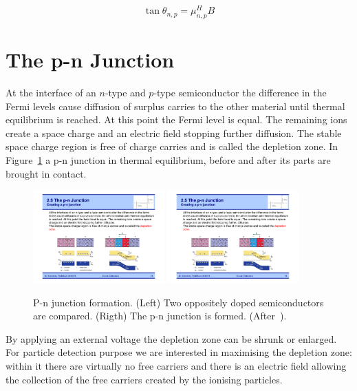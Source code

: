 \begin{equation}
\tan{\theta_{n,p}}=\mu_{n,p}^HB
\label{eq:LorentzAngle}
\end{equation}

\section{The p-n Junction}
\label{sec:pnjunction}

At the interface of an $n$-type and $p$-type semiconductor the difference in the Fermi levels cause 
diffusion 
of surplus carries to the other material until thermal equilibrium is reached. At this point the Fermi 
level 
is equal. The remaining ions create a 
space charge and an electric field stopping further diffusion. 
The stable space charge region is free of charge carries and is called the depletion zone. 
In Figure~\ref{fig:pnJunction} a p-n junction in thermal equilibrium, before and after its parts are 
brought in contact.

\begin{figure}[!htbp]
   \centering
   \includegraphics[width=0.45\textwidth]{p_close_to_n.pdf} 
   \includegraphics[width=0.45\textwidth]{pn_junction.pdf} 
   \caption{\label{fig:pnJunction}P-n junction formation. (Left) Two oppositely doped semiconductors 
   are compared. (Rigth) The p-n junction is formed. (After~\cite{Krammer}).}
\end{figure}



By applying an external voltage the depletion zone can be shrunk or enlarged. For particle detection 
purpose we are interested in maximising the depletion zone: within it there are virtually no 
free carriers and there is an electric field 
allowing the collection of the free carriers created by the ionising particles. 

